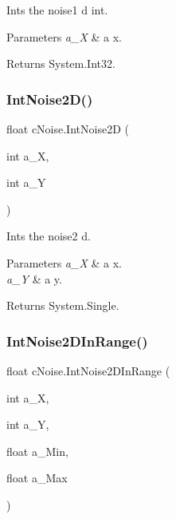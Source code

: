 Ints the noise1 d int. 


\begin{DoxyParams}{Parameters}
{\em a\+\_\+X} & a x.\\
\hline
\end{DoxyParams}
\begin{DoxyReturn}{Returns}
System.\+Int32.
\end{DoxyReturn}
\mbox{\label{classc_noise_ab49362af952295bfb3a4fa9f8c81422c}} 
\subsubsection{\texorpdfstring{Int\+Noise2\+D()}{IntNoise2D()}}
{\footnotesize\ttfamily float c\+Noise.\+Int\+Noise2D (\begin{DoxyParamCaption}\item[{int}]{a\+\_\+X,  }\item[{int}]{a\+\_\+Y }\end{DoxyParamCaption})\hspace{0.3cm}{\ttfamily [inline]}}



Ints the noise2 d. 


\begin{DoxyParams}{Parameters}
{\em a\+\_\+X} & a x.\\
\hline
{\em a\+\_\+Y} & a y.\\
\hline
\end{DoxyParams}
\begin{DoxyReturn}{Returns}
System.\+Single.
\end{DoxyReturn}
\mbox{\label{classc_noise_aee00ac876258c01fc0240ef2c069e390}} 
\subsubsection{\texorpdfstring{Int\+Noise2\+D\+In\+Range()}{IntNoise2DInRange()}}
{\footnotesize\ttfamily float c\+Noise.\+Int\+Noise2\+D\+In\+Range (\begin{DoxyParamCaption}\item[{int}]{a\+\_\+X,  }\item[{int}]{a\+\_\+Y,  }\item[{float}]{a\+\_\+\+Min,  }\item[{float}]{a\+\_\+\+Max }\end{DoxyParamCaption})\hspace{0.3cm}{\ttfamily [inline]}}



